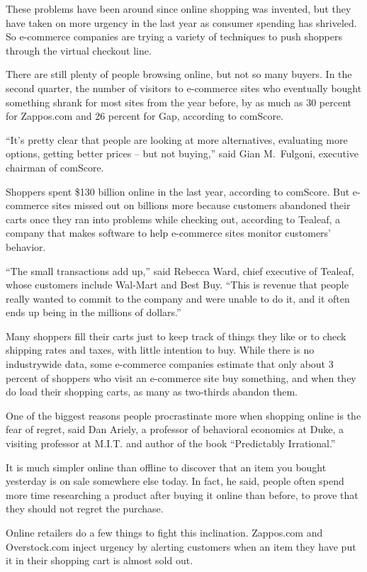 ﻿\documentclass[12pt]{article}
\begin{document}
These problems have been around since online shopping was invented, but they have taken on more
urgency in the last year as consumer spending has shriveled. So e-commerce companies are trying a
variety of techniques to push shoppers through the virtual checkout line.

There are still plenty of people browsing online, but not so many buyers. In the second quarter, the
number of visitors to e-commerce sites who eventually bought something shrank for most sites from
the year before, by as much as 30 percent for Zappos.com and 26 percent for Gap, according to
comScore.

``It's pretty clear that people are looking at more alternatives, evaluating more options, getting
better prices -- but not buying,'' said Gian M.~Fulgoni, executive chairman of comScore.

Shoppers spent \$130 billion online in the last year, according to comScore. But e-commerce sites
missed out on billions more because customers abandoned their carts once they ran into problems
while checking out, according to Tealeaf, a company that makes software to help e-commerce sites
monitor customers' behavior.

``The small transactions add up,'' said Rebecca Ward, chief executive of Tealeaf, whose customers
include Wal-Mart and Best Buy. ``This is revenue that people really wanted to commit to the company
and were unable to do it, and it often ends up being in the millions of dollars.''

Many shoppers fill their carts just to keep track of things they like or to check shipping rates and
taxes, with little intention to buy. While there is no industrywide data, some e-commerce companies
estimate that only about 3 percent of shoppers who visit an e-commerce site buy something, and when
they do load their shopping carts, as many as two-thirds abandon them.

One of the biggest reasons people procrastinate more when shopping online is the fear of regret,
said Dan Ariely, a professor of behavioral economics at Duke, a visiting professor at M.I.T. and
author of the book ``Predictably Irrational.''

It is much simpler online than offline to discover that an item you bought yesterday is on sale
somewhere else today. In fact, he said, people often spend more time researching a product after
buying it online than before, to prove that they should not regret the purchase.

Online retailers do a few things to fight this inclination. Zappos.com and Overstock.com inject
urgency by alerting customers when an item they have put it in their shopping cart is almost sold
out.
\end{document}
